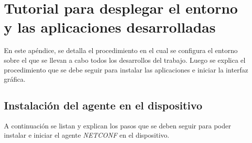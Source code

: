 
\chapter{Tutorial para desplegar el entorno y las aplicaciones desarrolladas} %

\label{AppendixA} %
En este apéndice, se detalla el procedimiento en el cual se configura el entorno sobre el que se llevan a cabo todos los desarrollos del trabajo. Luego se explica el procedimiento que se debe seguir para instalar las aplicaciones e iniciar la interfaz gráfica.


\section{Instalación del agente en el dispositivo}

A continuación se listan y explican los pasos que se deben seguir para poder instalar e iniciar el agente \textit{NETCONF} en el dispositivo.

